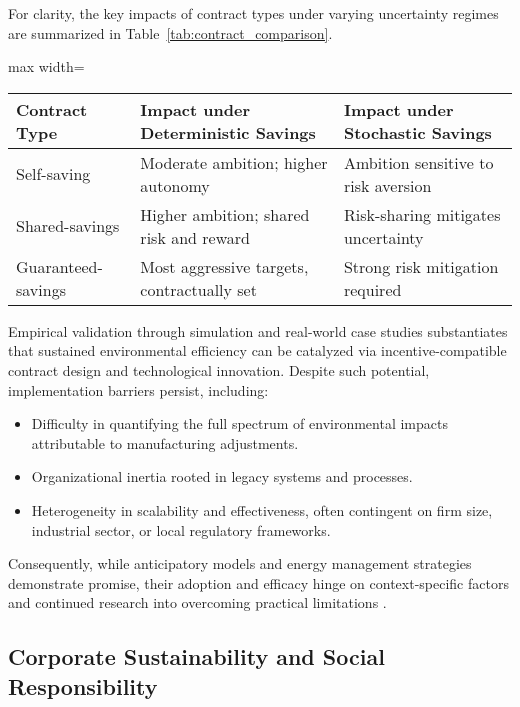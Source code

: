 \documentclass[sigconf]{acmart}
\begin{document}
For clarity, the key impacts of contract types under varying uncertainty regimes are summarized in Table~\ref{tab:contract_comparison}.

\begin{table*}[htbp]
\centering
\caption{Impacts of Contract Type and Uncertainty on Manufacturer Energy-Saving Decisions}
\label{tab:contract_comparison}
\begin{adjustbox}{max width=\textwidth}
\begin{tabular}{lll}
\toprule
\textbf{Contract Type} & \textbf{Impact under Deterministic Savings} & \textbf{Impact under Stochastic Savings} \\
\midrule
Self-saving            & Moderate ambition; higher autonomy          & Ambition sensitive to risk aversion      \\
Shared-savings         & Higher ambition; shared risk and reward     & Risk-sharing mitigates uncertainty       \\
Guaranteed-savings     & Most aggressive targets, contractually set  & Strong risk mitigation required          \\
\bottomrule
\end{tabular}
\end{adjustbox}
\end{table*}

Empirical validation through simulation and real-world case studies substantiates that sustained environmental efficiency can be catalyzed via incentive-compatible contract design and technological innovation. Despite such potential, implementation barriers persist, including:

\begin{itemize}
    \item Difficulty in quantifying the full spectrum of environmental impacts attributable to manufacturing adjustments.
    \item Organizational inertia rooted in legacy systems and processes.
    \item Heterogeneity in scalability and effectiveness, often contingent on firm size, industrial sector, or local regulatory frameworks.
\end{itemize}

Consequently, while anticipatory models and energy management strategies demonstrate promise, their adoption and efficacy hinge on context-specific factors and continued research into overcoming practical limitations \cite{ref80}.

\subsection{Corporate Sustainability and Social Responsibility}
\end{document}
